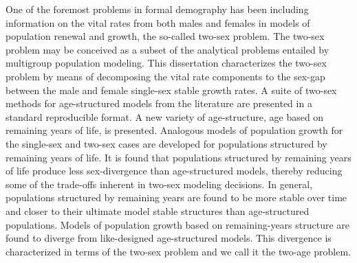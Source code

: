 
One of the foremost problems in formal demography has been including
information on the vital rates from both males and females in models of
population renewal and growth, the so-called two-sex problem. The two-sex
problem may be conceived as a subset of the analytical problems entailed by
multigroup population modeling. This dissertation characterizes the two-sex 
problem by means of decomposing the vital 
rate components to the sex-gap between the male and female single-sex stable growth
rates. A suite of two-sex methods for age-structured models from the
literature are presented in a standard reproducible format. A new variety of
age-structure, age based on remaining years of life, is presented. Analogous 
models of population growth for the
single-sex and two-sex cases are developed for populations structured by
remaining years of life. It is found that populations structured by remaining
years of life produce less sex-divergence than age-structured models,
thereby reducing some of the trade-offs inherent in two-sex modeling decisions.
In general, populations structured by remaining years are found to be more
stable over time and closer to their ultimate model stable structures than
age-structured populations. Models of population growth based on remaining-years 
structure are found to diverge from like-designed age-structured models. This
divergence is characterized in terms of the two-sex problem and we call it the
two-age problem.
